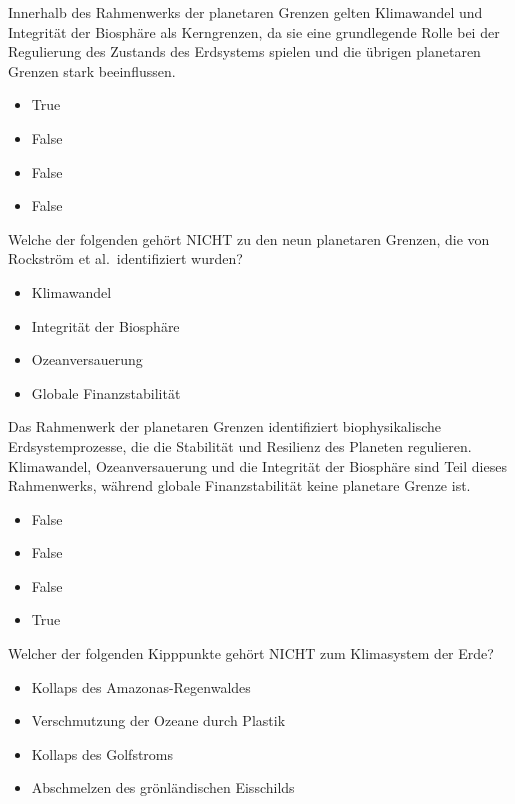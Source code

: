 \documentclass[
  nswissgerman,
  a4paper,
  DIV=11,
  numbers=noendperiod,
  oneside,
  openany]{scrreprt}
\providecommand{\tightlist}{%
  \setlength{\itemsep}{0pt}\setlength{\parskip}{0pt}}
\begin{document}
Innerhalb des Rahmenwerks der planetaren Grenzen gelten Klimawandel und
Integrität der Biosphäre als Kerngrenzen, da sie eine grundlegende Rolle
bei der Regulierung des Zustands des Erdsystems spielen und die übrigen
planetaren Grenzen stark beeinflussen.

\begin{itemize}
\tightlist
\item
  True
\item
  False
\item
  False
\item
  False
\end{itemize}

Welche der folgenden gehört NICHT zu den neun planetaren Grenzen, die
von Rockström et al.~identifiziert wurden?

\begin{itemize}
\tightlist
\item[$\square$]
  Klimawandel
\item[$\square$]
  Integrität der Biosphäre
\item[$\square$]
  Ozeanversauerung
\item[$\square$]
  Globale Finanzstabilität
\end{itemize}

Das Rahmenwerk der planetaren Grenzen identifiziert biophysikalische
Erdsystemprozesse, die die Stabilität und Resilienz des Planeten
regulieren. Klimawandel, Ozeanversauerung und die Integrität der
Biosphäre sind Teil dieses Rahmenwerks, während globale Finanzstabilität
keine planetare Grenze ist.

\begin{itemize}
\tightlist
\item
  False
\item
  False
\item
  False
\item
  True
\end{itemize}

Welcher der folgenden Kipppunkte gehört NICHT zum Klimasystem der Erde?

\begin{itemize}
\tightlist
\item[$\square$]
  Kollaps des Amazonas-Regenwaldes
\item[$\square$]
  Verschmutzung der Ozeane durch Plastik
\item[$\square$]
  Kollaps des Golfstroms
\item[$\square$]
  Abschmelzen des grönländischen Eisschilds
\end{itemize}
\end{document}
